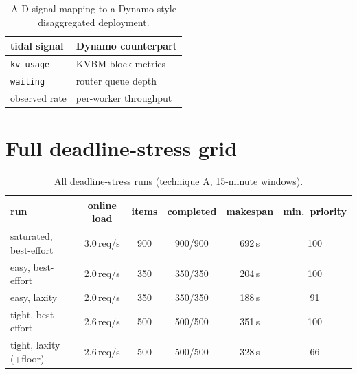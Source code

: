 \documentclass[11pt]{article}
\newcommand{\code}[1]{\texttt{#1}}
\begin{document}
\begin{table}[!htbp]
\centering
\caption{A-D signal mapping to a Dynamo-style disaggregated deployment.}
\label{tab:dynamo}
\begin{tabular}{ll}
\toprule
tidal signal & Dynamo counterpart \\
\midrule
\code{kv\_usage}   & KVBM block metrics \\
\code{waiting}     & router queue depth \\
observed rate      & per-worker throughput \\
\bottomrule
\end{tabular}
\end{table}

\clearpage

\section{Full deadline-stress grid}
\label{app:deadline}

\begin{table}[!htbp]
\centering
\caption{All deadline-stress runs (technique A, 15-minute windows).}
\label{tab:deadline-full}
\begin{tabular}{lccccc}
\toprule
run & online load & items & completed & makespan & min.\ priority \\
\midrule
saturated, best-effort & 3.0\,req/s & 900 & 900/900 & 692\,s & 100 \\
easy, best-effort      & 2.0\,req/s & 350 & 350/350 & 204\,s & 100 \\
easy, laxity           & 2.0\,req/s & 350 & 350/350 & 188\,s & 91 \\
tight, best-effort     & 2.6\,req/s & 500 & 500/500 & 351\,s & 100 \\
tight, laxity (+floor) & 2.6\,req/s & 500 & 500/500 & 328\,s & 66 \\
\bottomrule
\end{tabular}
\end{table}

\clearpage
\end{document}
